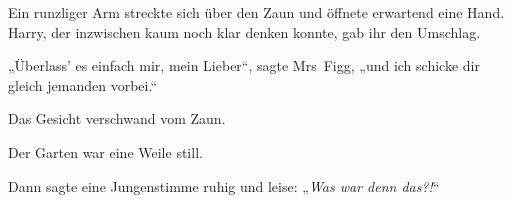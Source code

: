 Ein runzliger Arm streckte sich über den Zaun und öffnete erwartend eine Hand. Harry, der inzwischen kaum noch klar denken konnte, gab ihr den Umschlag.

„Überlass' es einfach mir, mein Lieber“, sagte Mrs~Figg, „und ich schicke dir gleich jemanden vorbei.“

Das Gesicht verschwand vom Zaun.

Der Garten war eine Weile still.

Dann sagte eine Jungenstimme ruhig und leise: „\emph{Was war denn das?!}“
